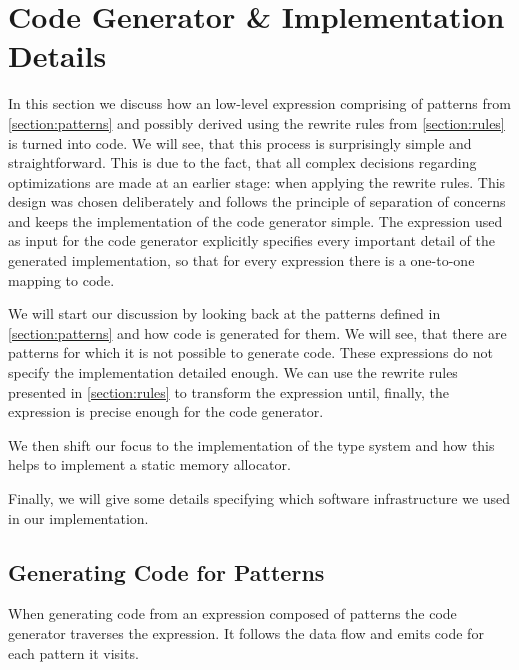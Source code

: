 
\section{Code Generator \& Implementation Details}
In this section we discuss how an low-level expression comprising of patterns from \autoref{section:patterns} and possibly derived using the rewrite rules from \autoref{section:rules} is turned into \OpenCL code.
We will see, that this process is surprisingly simple and straightforward.
This is due to the fact, that all complex decisions regarding optimizations are made at an earlier stage: when applying the rewrite rules.
This design was chosen deliberately and follows the principle of separation of concerns and keeps the implementation of the code generator simple.
The expression used as input for the code generator explicitly specifies every important detail of the generated \OpenCL implementation, so that for every expression there is a one-to-one mapping to \OpenCL code.

We will start our discussion by looking back at the patterns defined in \autoref{section:patterns} and how \OpenCL code is generated for them.
We will see, that there are patterns for which it is not possible to generate \OpenCL code.
These expressions do not specify the \OpenCL implementation detailed enough.
We can use the rewrite rules presented in \autoref{section:rules} to transform the expression until, finally, the expression is precise enough for the code generator.

We then shift our focus to the implementation of the type system and how this helps to implement a static memory allocator.

Finally, we will give some details specifying which software infrastructure we used in our implementation.

\subsection{Generating \OpenCL Code for Patterns}
When generating \OpenCL code from an expression composed of patterns the code generator traverses the expression.
It follows the data flow and emits code for each pattern it visits.

